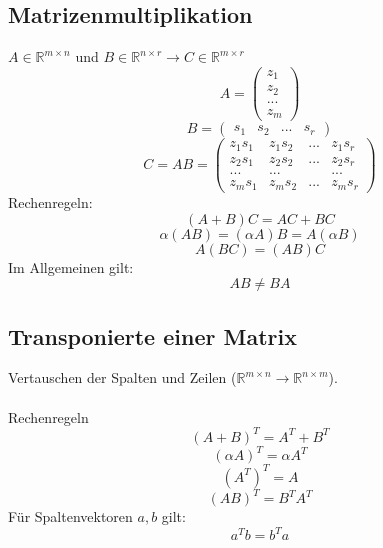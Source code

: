 \documentclass[a4paper,twocolumn,10pt]{article}
\begin{document}
\subsection{Matrizenmultiplikation}
$A\in\mathbb{R}^{m\times n}$ und $B\in\mathbb{R}^{n\times r}\rightarrow C\in\mathbb{R}^{m\times r}$
\begin{equation*}
A=\begin{pmatrix}z_1\\z_2\\...\\z_m\end{pmatrix}
\end{equation*}
\begin{equation*}
B=\begin{pmatrix}s_1 & s_2 & ... & s_r\end{pmatrix}
\end{equation*}
\begin{equation*}
C=AB=\begin{pmatrix}z_1s_1 & z_1s_2 & ... & z_1s_r \\ z_2s_1 & z_2s_2 & ... & z_2s_r \\ ... & ... & & ... \\ z_ms_1 & z_ms_2 & ... & z_ms_r\end{pmatrix}
\end{equation*}
Rechenregeln:
\begin{equation*}
(A+B)C=AC+BC
\end{equation*}
\begin{equation*}
\alpha(AB)=(\alpha A)B = A(\alpha B)
\end{equation*}
\begin{equation*}
A(BC)=(AB)C
\end{equation*}
Im Allgemeinen gilt:
\begin{equation*}
AB \neq BA
\end{equation*}

\subsection{Transponierte einer Matrix}
Vertauschen der Spalten und Zeilen ($\mathbb{R}^{m\times n}\rightarrow \mathbb{R}^{n\times m}$).\\\\
Rechenregeln
\begin{equation*}
(A+B)^T=A^T+B^T
\end{equation*}
\begin{equation*}
(\alpha A)^T=\alpha A^T
\end{equation*}
\begin{equation*}
(A^T)^T =A
\end{equation*}
\begin{equation*}
(AB)^T=B^TA^T
\end{equation*}
Für Spaltenvektoren $a,b$ gilt:
\begin{equation*}
a^Tb=b^Ta
\end{equation*}
\end{document}
